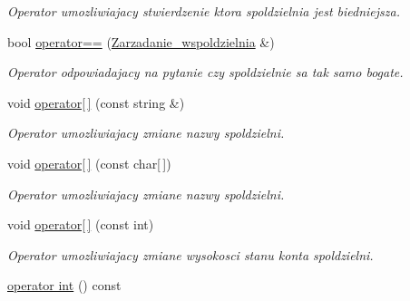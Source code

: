 \begin{DoxyCompactItemize}
\begin{DoxyCompactList}\small\item\em Operator umozliwiajacy stwierdzenie ktora spoldzielnia jest biedniejsza. \end{DoxyCompactList}\item 
\hypertarget{class_zarzadanie__wspoldzielnia_a5bed74d5c89f68cb887db0adfdf2c7f3}{}bool \hyperlink{class_zarzadanie__wspoldzielnia_a5bed74d5c89f68cb887db0adfdf2c7f3}{operator==} (\hyperlink{class_zarzadanie__wspoldzielnia}{Zarzadanie\+\_\+wspoldzielnia} \&)\label{class_zarzadanie__wspoldzielnia_a5bed74d5c89f68cb887db0adfdf2c7f3}

\begin{DoxyCompactList}\small\item\em Operator odpowiadajacy na pytanie czy spoldzielnie sa tak samo bogate. \end{DoxyCompactList}\item 
\hypertarget{class_zarzadanie__wspoldzielnia_a892af36fbe7745711903ad144275a13c}{}void \hyperlink{class_zarzadanie__wspoldzielnia_a892af36fbe7745711903ad144275a13c}{operator\mbox{[}$\,$\mbox{]}} (const string \&)\label{class_zarzadanie__wspoldzielnia_a892af36fbe7745711903ad144275a13c}

\begin{DoxyCompactList}\small\item\em Operator umozliwiajacy zmiane nazwy spoldzielni. \end{DoxyCompactList}\item 
\hypertarget{class_zarzadanie__wspoldzielnia_ad9646551b947b99460ca544bc7f5b2b9}{}void \hyperlink{class_zarzadanie__wspoldzielnia_ad9646551b947b99460ca544bc7f5b2b9}{operator\mbox{[}$\,$\mbox{]}} (const char\mbox{[}$\,$\mbox{]})\label{class_zarzadanie__wspoldzielnia_ad9646551b947b99460ca544bc7f5b2b9}

\begin{DoxyCompactList}\small\item\em Operator umozliwiajacy zmiane nazwy spoldzielni. \end{DoxyCompactList}\item 
\hypertarget{class_zarzadanie__wspoldzielnia_a248d69f67a8c142f3cd5f3afb8fc4ac4}{}void \hyperlink{class_zarzadanie__wspoldzielnia_a248d69f67a8c142f3cd5f3afb8fc4ac4}{operator\mbox{[}$\,$\mbox{]}} (const int)\label{class_zarzadanie__wspoldzielnia_a248d69f67a8c142f3cd5f3afb8fc4ac4}

\begin{DoxyCompactList}\small\item\em Operator umozliwiajacy zmiane wysokosci stanu konta spoldzielni. \end{DoxyCompactList}\item 
\hypertarget{class_zarzadanie__wspoldzielnia_a076ea47fd2fe403cde12c15b8341b703}{}\hyperlink{class_zarzadanie__wspoldzielnia_a076ea47fd2fe403cde12c15b8341b703}{operator int} () const \label{class_zarzadanie__wspoldzielnia_a076ea47fd2fe403cde12c15b8341b703}


\end{DoxyCompactItemize}
